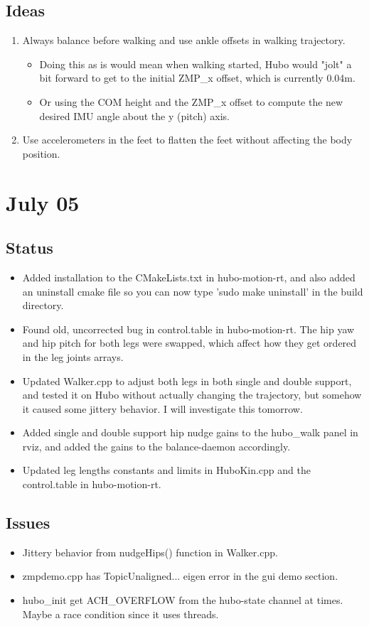 \documentclass[letterpaper, 10 pt]{report}
\begin{document}
\subsection*{Ideas}
\begin{enumerate}
\item Always balance before walking and use ankle offsets in walking trajectory.
\begin{itemize}
\item Doing this as is would mean when walking started, Hubo would "jolt" a bit forward to get to the initial ZMP\_x offset, which is currently 0.04m. 
\item Or using the COM height and the ZMP\_x offset to compute the new desired IMU angle about the y (pitch) axis.
\end{itemize}
\item Use accelerometers in the feet to flatten the feet without affecting the body position.
\end{enumerate}

\section*{July 05}
\subsection*{Status}
\begin{itemize}
\item Added installation to the CMakeLists.txt in hubo-motion-rt, and also added an uninstall cmake file so you can now type 'sudo make uninstall' in the build directory.
\item Found old, uncorrected bug in control.table in hubo-motion-rt. The hip yaw and hip pitch for both legs were swapped, which affect how they get ordered in the leg joints arrays.
\item Updated Walker.cpp to adjust both legs in both single and double support, and tested it on Hubo without actually changing the trajectory, but somehow it caused some jittery behavior. I will investigate this tomorrow.
\item Added single and double support hip nudge gains to the hubo\_walk panel in rviz, and added the gains to the balance-daemon accordingly.
\item Updated leg lengths constants and limits in HuboKin.cpp and the control.table in hubo-motion-rt. 
\end{itemize}
\subsection*{Issues}
\begin{itemize}
\item Jittery behavior from nudgeHips() function in Walker.cpp.
\item zmpdemo.cpp has TopicUnaligned... eigen error in the gui demo section.
\item hubo\_init get ACH\_OVERFLOW from the hubo-state channel at times. Maybe a race condition since it uses threads.
\end{itemize}
\end{document}
